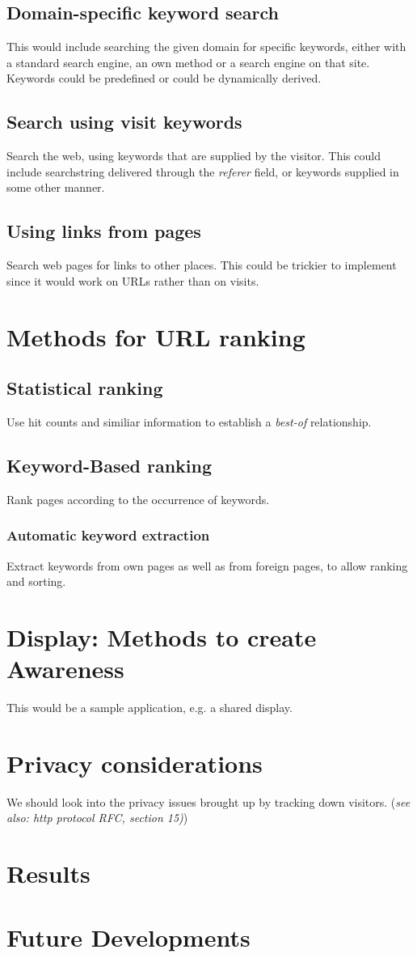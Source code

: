 \documentclass[a4paper]{danarticle}
\begin{document}
    \subsection*{Domain-specific keyword search}
      This would include searching the given domain for specific keywords,
      either with a standard search engine, an own method or a search engine on
      that site. Keywords could be predefined or could be dynamically derived.
    \subsection*{Search using visit keywords}
      Search the web, using keywords that are supplied by the visitor. This
      could include searchstring delivered through the \textit{referer} field,
      or keywords supplied in some other manner.
    \subsection*{Using links from pages}
      Search web pages for links to other places. This could be trickier to
      implement since it would work on URLs rather than on visits.
  \section*{Methods for URL ranking}
    \subsection*{Statistical ranking}
      Use hit counts and similiar information to establish a \textit{best-of}
      relationship.
    \subsection*{Keyword-Based ranking}
      Rank pages according to the occurrence of keywords.
      \subsubsection*{Automatic keyword extraction}
        Extract keywords from own pages as well as from foreign pages, to allow
	ranking and sorting.
  \section*{Display: Methods to create Awareness}
    This would be a sample application, e.g. a shared display. 
  \section*{Privacy considerations}
    We should look into the privacy issues brought up by tracking down visitors.
    (\textit{see also: http protocol RFC, section 15)})
  \section*{Results}
  \section*{Future Developments}
\end{document}
